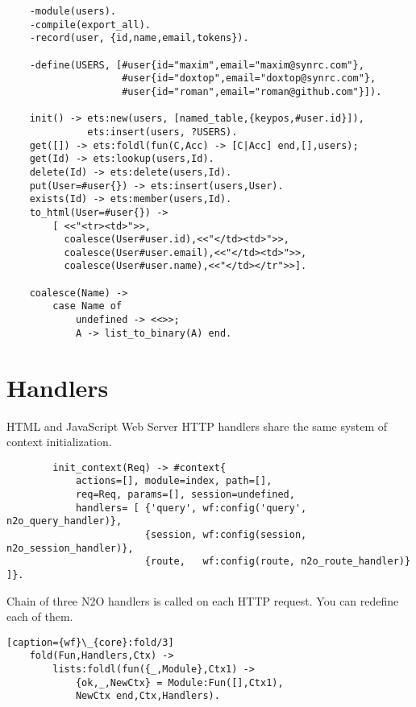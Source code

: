 \vspace{1\baselineskip}
\begin{lstlisting}
    -module(users).
    -compile(export_all).
    -record(user, {id,name,email,tokens}).

    -define(USERS, [#user{id="maxim",email="maxim@synrc.com"},
                    #user{id="doxtop",email="doxtop@synrc.com"},
                    #user{id="roman",email="roman@github.com"}]).

    init() -> ets:new(users, [named_table,{keypos,#user.id}]),
              ets:insert(users, ?USERS).
    get([]) -> ets:foldl(fun(C,Acc) -> [C|Acc] end,[],users);
    get(Id) -> ets:lookup(users,Id).
    delete(Id) -> ets:delete(users,Id).
    put(User=#user{}) -> ets:insert(users,User).
    exists(Id) -> ets:member(users,Id).
    to_html(User=#user{}) ->
        [ <<"<tr><td>">>,
          coalesce(User#user.id),<<"</td><td>">>,
          coalesce(User#user.email),<<"</td><td>">>,
          coalesce(User#user.name),<<"</td></tr">>].

    coalesce(Name) -> 
        case Name of 
            undefined -> <<>>;
            A -> list_to_binary(A) end.
\end{lstlisting}
\vspace{1\baselineskip}

\section{Handlers}
HTML and JavaScript Web Server HTTP handlers share the same system
of context initialization. 

\vspace{1\baselineskip}
\begin{lstlisting}
        init_context(Req) -> #context{
            actions=[], module=index, path=[],
            req=Req, params=[], session=undefined,
            handlers= [ {'query', wf:config('query', n2o_query_handler)},
                        {session, wf:config(session, n2o_session_handler)},
                        {route,   wf:config(route, n2o_route_handler)} ]}.
\end{lstlisting}
\vspace{1\baselineskip}

Chain of three N2O handlers is called
on each HTTP request. You can redefine each of them.

\vspace{1\baselineskip}
\begin{lstlisting}[caption={wf}\_{core}:fold/3]
    fold(Fun,Handlers,Ctx) ->
        lists:foldl(fun({_,Module},Ctx1) ->
            {ok,_,NewCtx} = Module:Fun([],Ctx1),
            NewCtx end,Ctx,Handlers).
\end{lstlisting}
\vspace{1\baselineskip}

